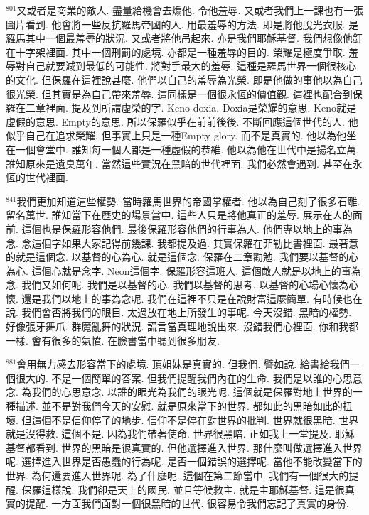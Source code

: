 \documentclass{book}
\begin{document}
$^{801}$又或者是商業的敵人.
盡量給機會去煽他.
令他羞辱.
又或者我們上一課也有一張圖片看到.
他會將一些反抗羅馬帝國的人.
用最羞辱的方法.
即是將他脫光衣服.
是羅馬其中一個最羞辱的狀況.
又或者將他吊起來.
亦是我們耶穌基督.
我們想像他釘在十字架裡面.
其中一個刑罰的處境.
亦都是一種羞辱的目的.
榮耀是極度爭取.
羞辱對自己就要減到最低的可能性.
將對手最大的羞辱.
這種是羅馬世界一個很核心的文化.
但保羅在這裡說甚麼.
他們以自己的羞辱為光榮.
即是他做的事他以為自己很光榮.
但其實是為自己帶來羞辱.
這同樣是一個很永恆的價值觀.
這裡也配合到保羅在二章裡面.
提及到所謂虛榮的字.
Keno-doxia.
Doxia是榮耀的意思.
Keno就是虛假的意思.
Empty的意思.
所以保羅似乎在前前後後.
不斷回應這個世代的人.
他似乎自己在追求榮耀.
但事實上只是一種Empty glory.
而不是真實的.
他以為他坐在一個會堂中.
誰知每一個人都是一種虛假的恭維.
他以為他在世代中是揚名立萬.
誰知原來是遺臭萬年.
當然這些實況在黑暗的世代裡面.
我們必然會遇到.
甚至在永恆的世代裡面.

$^{841}$我們更加知道這些權勢.
當時羅馬世界的帝國掌權者.
他以為自己刻了很多石雕.
留名萬世.
誰知當下在歷史的場景當中.
這些人只是將他真正的羞辱.
展示在人的面前.
這個也是保羅形容他們.
最後保羅形容他們的行事為人.
他們專以地上的事為念.
念這個字如果大家記得前幾課.
我都提及過.
其實保羅在菲勒比書裡面.
最著意的就是這個念.
以基督的心為心.
就是這個念.
保羅在二章勸勉.
我們要以基督的心為心.
這個心就是念字.
Neon這個字.
保羅形容這班人.
這個敵人就是以地上的事為念.
我們又如何呢.
我們是以基督的心.
我們以基督的思考.
以基督的心場心懷為心懷.
還是我們以地上的事為念呢.
我們在這裡不只是在說財富這麼簡單.
有時候也在說.
我們會否將我們的眼目.
太過放在地上所發生的事呢.
今天沒錯.
黑暗的權勢.
好像張牙舞爪.
群魔亂舞的狀況.
謊言當真理地說出來.
沒錯我們心裡面.
你和我都一樣.
會有很多的氣憤.
在臉書當中聽到很多朋友.

$^{881}$會用無力感去形容當下的處境.
頂姐妹是真實的.
但我們.
譬如說.
給書給我們一個很大的.
不是一個簡單的答案.
但我們提醒我們內在的生命.
我們是以誰的心思意念.
為我們的心思意念.
以誰的眼光為我們的眼光呢.
這個就是保羅對地上世界的一種描述.
並不是對我們今天的安慰.
就是原來當下的世界.
都如此的黑暗如此的扭壞.
但這個不是信仰停了的地步.
信仰不是停在對世界的批判.
世界就很黑暗.
世界就是沒得救.
這個不是.
因為我們帶著使命.
世界很黑暗.
正如我上一堂提及.
耶穌基督都看到.
世界的黑暗是很真實的.
但他選擇進入世界.
那什麼叫做選擇進入世界呢.
選擇進入世界是否愚蠢的行為呢.
是否一個錯誤的選擇呢.
當他不能改變當下的世界.
為何還要進入世界呢.
為了什麼呢.
這個在第二節當中.
我們有一個很大的提醒.
保羅這樣說.
我們卻是天上的國民.
並且等候救主.
就是主耶穌基督.
這是很真實的提醒.
一方面我們面對一個很黑暗的世代.
很容易令我們忘記了真實的身份.
\end{document}
